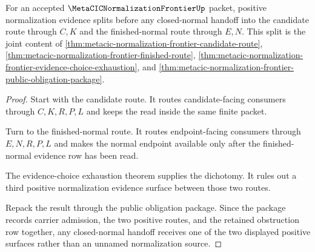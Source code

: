\begin{theorem}
\label{thm:metacic-normalization-frontier-obligation-closure-evidence-split}
For an accepted $\MetaCICNormalizationFrontierUp$ packet, positive normalization evidence splits before any closed-normal handoff into the candidate route through $C,K$ and the finished-normal route through $E,N$. This split is the joint content of \autoref{thm:metacic-normalization-frontier-candidate-route}, \autoref{thm:metacic-normalization-frontier-finished-route}, \autoref{thm:metacic-normalization-frontier-evidence-choice-exhaustion}, and \autoref{thm:metacic-normalization-frontier-public-obligation-package}.
\end{theorem}
\begin{proof}
Start with the candidate route. It routes candidate-facing consumers through $C,K,R,P,L$ and keeps the read inside the same finite packet.

Turn to the finished-normal route. It routes endpoint-facing consumers through $E,N,R,P,L$ and makes the normal endpoint available only after the finished-normal evidence row has been read.

The evidence-choice exhaustion theorem supplies the dichotomy. It rules out a third positive normalization evidence surface between those two routes.

Repack the result through the public obligation package. Since the package records carrier admission, the two positive routes, and the retained obstruction row together, any closed-normal handoff receives one of the two displayed positive surfaces rather than an unnamed normalization source.
\end{proof}

